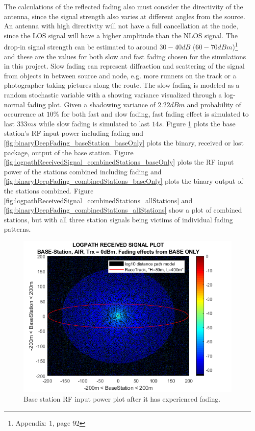 \noindent The calculations of the reflected fading also must consider the directivity of the antenna, since the signal strength also varies at different angles from the source. An antenna with high directivity will not have a full cancellation at the node, since the LOS signal will have a higher amplitude than the NLOS signal. The drop-in signal strength can be estimated to around $30-40dB$ ($60-70dBm$)\footnote{Appendix: 1, \cite{Karl2006} page 92} and these are the values for both slow and fast fading chosen for the simulations in this project. Slow fading can represent diffraction and scattering of the signal from objects in between source and node, e.g. more runners on the track or a photographer taking pictures along the route. The slow fading is modeled as a random stochastic variable with a showing variance visualized through a log-normal fading plot. Given a shadowing variance of $2.22dBm$ and probability of occurrence at $10\%$ for both fast and slow fading, fast fading effect is simulated to last $333 ms$ while slow fading is simulated to last $14s$. Figure \ref{fig:logpathReceivedSignal_baseStation_baseOnly} plots the base station's RF input power including fading and \ref{fig:binaryDeepFading_baseStation_baseOnly} plots the binary, received or lost package, output of the base station. Figure \ref{fig:logpathReceivedSignal_combinedStations_baseOnly} plots the RF input power of the stations combined including fading and \ref{fig:binaryDeepFading_combinedStations_baseOnly} plots the binary output of the stations combined. Figure \ref{fig:logpathReceivedSignal_combinedStations_allStations} and \ref{fig:binaryDeepFading_combinedStations_allStations} show a plot of combined stations, but with all three station signals being victims of individual fading patterns.

\begin{figure}[H]
	\centering
	\includegraphics[width=\linewidth]{theory/fading/fig/logpathReceivedSignal_baseStation_baseOnly.png}
	\caption{Base station RF input power plot after it has experienced fading.}
	\label{fig:logpathReceivedSignal_baseStation_baseOnly}
\end{figure}


